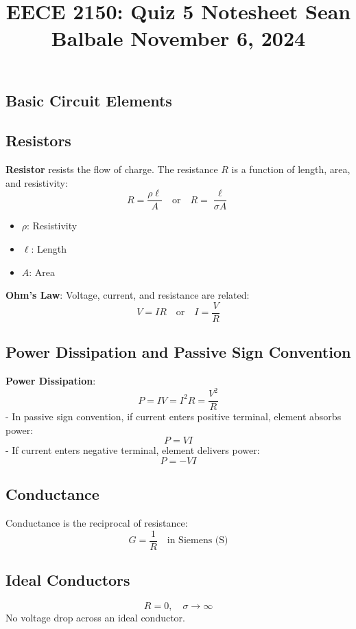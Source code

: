 \documentclass[9pt]{article}
\title{
    \vspace{-2em}
    \large EECE 2150: Quiz 5 Notesheet \hfill Sean Balbale \hfill November 6, 2024
    \vspace{-4em}
}
\date{}
\begin{document}
\maketitle

\begin{multicols*}{2}

\section{Basic Circuit Elements}

\subsection{Resistors}
\textbf{Resistor} resists the flow of charge. The resistance \(R\) is a function of length, area, and resistivity:
\[
R = \frac{\rho \ell}{A} \quad \text{or} \quad R = \frac{\ell}{\sigma A}
\]
\begin{itemize}\itemsep0pt
    \item \( \rho \): Resistivity
    \item \( \ell \): Length
    \item \( A \): Area
\end{itemize}

\textbf{Ohm's Law}: Voltage, current, and resistance are related:
\[ V = IR \quad \text{or} \quad I = \frac{V}{R} \]

\subsection{Power Dissipation and Passive Sign Convention}
\textbf{Power Dissipation}:
\[ P = IV = I^2 R = \frac{V^2}{R} \]
- In passive sign convention, if current enters positive terminal, element absorbs power: \[ P = VI \]
- If current enters negative terminal, element delivers power: \[ P = -VI \]

\subsection{Conductance}
Conductance is the reciprocal of resistance:
\[ G = \frac{1}{R} \quad \text{in Siemens (S)} \]

\subsection{Ideal Conductors}
\[ R = 0, \quad \sigma \to \infty \]
No voltage drop across an ideal conductor.


\end{multicols*}
\end{document}
